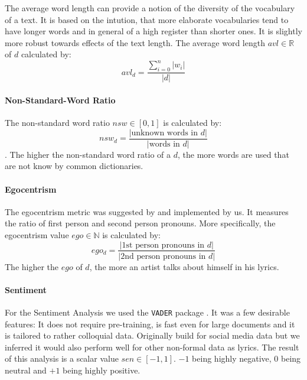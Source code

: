 \documentclass[11pt,a4paper]{article}
\begin{document}
The average word length can provide a notion of the diversity of the vocabulary of a text. It is based on the intution, that more elaborate vocabularies tend to have longer words and in general of a high register than shorter ones. It is slightly more robust towards effects of the text length. The average word length $avl \in \mathbb{R}$ of $d$ calculated by:
\begin{equation}
	avl_{d} = \frac{\sum_{i=0}^n |w_i|}{|d|}
\end{equation} 

\paragraph{Non-Standard-Word Ratio}

The non-standard word ratio $nsw \in [0,1]$ is calculated by:
\begin{equation}
	nsw_{d} = \frac{|\text{unknown words in }d|}{|\text{words in }d|}
\end{equation}
. The higher the non-standard word ratio of a $d$, the more words are used that are not know by common dictionaries. 

\paragraph{Egocentrism}

The egocentrism metric was suggested by \citet{DBLP:conf/coling/FellS14} and implemented by us. It measures the ratio of first person and second person pronouns. More specifically, the egocentrism value $ego \in \mathbb{N}$ is calculated by:
\begin{equation}
	ego_{d} = \frac{|\text{1st person pronouns in }d|}{|\text{2nd person pronouns in }d|}
\end{equation} 
The higher the $ego$ of $d$, the more an artist talks about himself in his lyrics.

\paragraph{Sentiment}

For the Sentiment Analysis we used the \texttt{VADER} package \citep{hutto2014vader}. It was a few desirable features: It does not require pre-training, is fast even for large documents and it is tailored to rather colloquial data. Originally build for social media data but we inferred it would also perform well for other non-formal data as lyrics. The result of this analysis is a scalar value $sen \in [-1,1]$. $-1$ being highly negative, $0$ being neutral and $+1$ being highly positive. 
\end{document}
